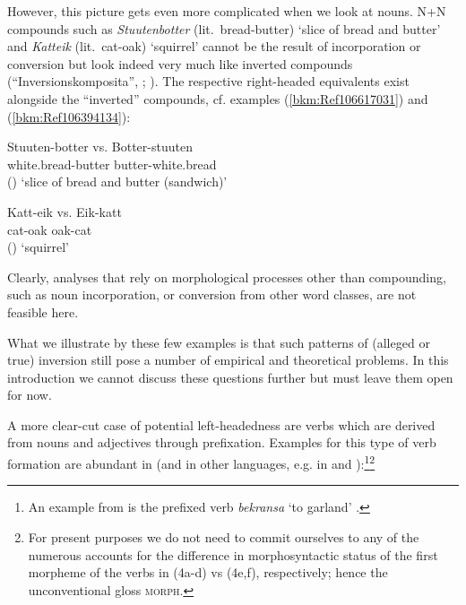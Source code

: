 \documentclass[output=paper
  ,nobabel
  ,draftmode
  ,colorlinks, citecolor=brown
]{langscibook}
\begin{document}
However, this picture gets even more complicated when we look at nouns. N+N compounds such as
\emph{Stuutenbotter} (lit.\ bread-butter) `slice of bread and butter' and \emph{Katteik}
(lit.\ cat-oak) `squirrel' cannot be the result of incorporation or conversion but look indeed very
much like inverted compounds (``Inversionskomposita'', \citealt[61–62]{OrtnerOrtner1984};
\citealt{Olsen2015a}). The respective right-headed equivalents exist alongside the “inverted''
compounds, cf. examples (\ref{bkm:Ref106617031}) and (\ref{bkm:Ref106394134}):

\ea
\label{bkm:Ref106617031}
\gll Stuuten-botter     vs.     Botter-stuuten\\
     white.bread-butter {}  butter-white.bread\\\hfill()
\glt   `slice of bread and butter (sandwich)'
\z

\ea
\label{bkm:Ref106394134}
\gll   Katt-eik   vs.   Eik-katt\\
       cat-oak    {}   oak-cat \\\hfill()
\glt   `squirrel'
\z

\noindent
Clearly, analyses that rely on morphological processes other than compounding, such as noun
incorporation, or conversion from other word classes, are not feasible here.

What we illustrate by these few examples is that such patterns of (alleged or true) inversion still
pose a number of empirical and theoretical problems. In this introduction we cannot discuss these
questions further but must leave them open for now.

A more clear-cut case of potential left-headedness are verbs which are derived from nouns and
adjectives through prefixation. Examples for this type of verb formation are abundant in  (and
in other  languages, e.g. in  and ):\footnote{An example from  is the
  prefixed verb \emph{bekransa} `to garland' \citep[90]{Schmidt1996}.}\footnote{For present purposes we do not need to commit ourselves to any of the numerous accounts for the difference in morphosyntactic status of the first morpheme of the verbs in (4a-d) vs (4e,f), respectively; hence the unconventional gloss \textsc{morph}.}
\end{document}
